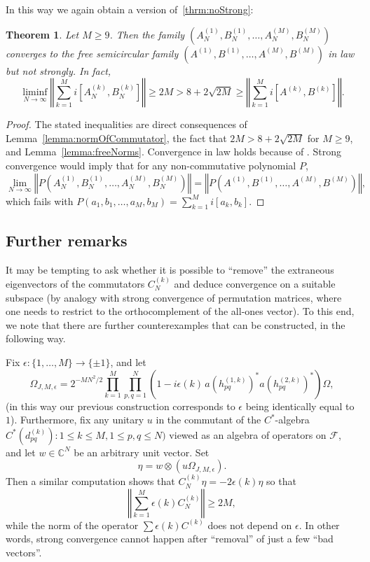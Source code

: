 \documentclass[11pt]{article}
\newtheorem{theorem}{Theorem}
\begin{document}
In this way we again obtain a version of~\ref{thrm:noStrong}:

\begin{theorem}\label{thrm:noStrongWeaker}
Let $M\geq 9$. Then the family $(A_N^{(1)},B_N^{(1)},\dots,A_N^{(M)},B_N^{(M)})$ converges to the free semicircular family $(A^{(1)},B^{(1)},\dots,A^{(M)},B^{(M)})$ in law but not strongly.  In fact,
\[
\liminf_{N\to \infty } \left\Vert \sum_{k=1}^M i[A^{(k)}_N, B^{(k)}_N] \right\Vert \geq 2M > 8 + 2\sqrt{2M} \geq \left\Vert \sum_{k=1}^M i[A^{(k)}, B^{(k)}]\right\Vert.
\]
\end{theorem}

\begin{proof}
The stated inequalities are direct consequences of Lemma~\ref{lemma:normOfCommutator}, the fact that $2M > 8 + 2\sqrt{2M}$ for $M\geq 9$, and Lemma~\ref{lemma:freeNorms}.  Convergence in law holds because of \cite{Shlyakhtenko:Matrices}.  Strong convergence would imply that for any non-commutative polynomial $P$, 
\[\lim_{N\to\infty} \left\Vert P(A_N^{(1)},B_N^{(1)},\dots,A_N^{(M)},B_N^{(M)})\right\Vert = 
\left\Vert P(A^{(1)},B^{(1)},\dots,A^{(M)},B^{(M)})\right\Vert, \] which fails with 
$P(a_1,b_1,\dots,a_M,b_M)=\sum_{k=1}^M i[a_k,b_k]$.
\end{proof}


\subsection{Further remarks}\label{sec:OtherOmeags}
It may be tempting to ask whether it is possible to ``remove'' the extraneous eigenvectors of the commutators $C^{(k)}_N$ and deduce convergence on a suitable subspace (by analogy with strong convergence of permutation matrices, where one needs to restrict to the orthocomplement of the all-ones vector). To this end, we note that there are further counterexamples that can be constructed, in the following way.

Fix $\epsilon : \{1,\dots,M\} \to \{\pm 1\}$, and let\[
    \Omega_{J,M,\epsilon}
    =
    2^{-MN^2/2}
    \prod_{k=1}^M\prod_{p,q=1}^N
    \left(
      1-i\epsilon(k)\,a(h^{(1,k)}_{pq})^*a(h^{(2,k)}_{pq})^*
    \right)\Omega,
\]
(in this way our previous construction corresponds to $\epsilon$ being identically equal to $1$).  Furthermore, fix any unitary $u$ in the commutant of the $C^*$-algebra $C^*(d^{(k)}_{pq}):1\leq k\leq M, 1\leq p,q\leq N)$ viewed as an algebra of operators on $\mathscr{F}$, and let $w\in \mathbb{C}^N$ be an arbitrary unit vector.  Set 
$$
\eta = w\otimes (u\Omega_{J,M,\epsilon}).$$ Then a similar computation shows that 
$C_N^{(k)} \eta = -2 \epsilon(k)\eta$ so that $$\left\Vert\sum_{k=1}^M \epsilon(k) C_N^{(k)}\right\Vert \geq 2M,$$  while the norm of the operator $\sum \epsilon(k)C^{(k)}$ does not depend on $\epsilon$. In other words, strong convergence cannot happen after ``removal'' of just a few ``bad vectors''.
\end{document}

